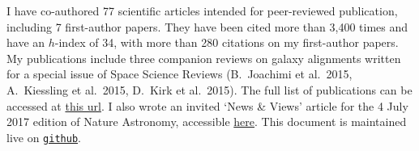 I have co-authored 77 scientific articles intended for peer-reviewed 
publication, including 7 first-author papers. They have been cited more than 
3,400 times and have an $h$-index of 34, with more than 280 citations on my 
first-author papers. My publications include three companion reviews on galaxy 
alignments written for a special issue of Space Science Reviews (B.\ Joachimi et 
al.\ 2015, A.\ Kiessling et al.\ 2015, D.\ Kirk et al.\ 2015). The full list of 
publications can be accessed at \href{https://goo.gl/LAu9G4}{this url}. I also 
wrote an invited `News \& Views' article for the 4 July 2017 edition of Nature 
Astronomy, accessible 
\href{https://www.nature.com/articles/s41550-017-0181}{here}.
%
This document is maintained live on
\href{https://github.com/cristobal-sifon/cv/blob/master/Sifon_publications.pdf}{\texttt{github}}.

